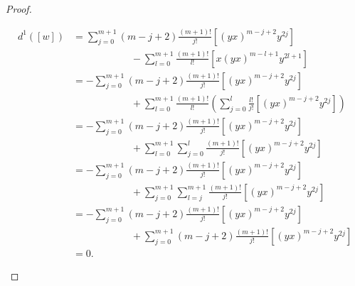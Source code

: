 \documentclass[a4paper,oneside,fleqn,11pt]{article}
\numberwithin{prop}{subsection}
\begin{document}
\begin{proof}
\begin{itemize}
			\begin{align*}
				d^1(\left[w\right]) &=
					\sum_{j = 0}^{m + 1}(m - j + 2)\frac{(m + 1)!}{j!}\left[(yx)^{m -j + 2}y^{2j}\right]\\
				& \hspace{70pt}-\sum_{l = 0}^{m + 1}\frac{(m + 1)!}{l!}\left[x(yx)^{m - l + 1}y^{2l + 1}\right] \\
				&=-\sum_{j = 0}^{m + 1}(m - j + 2)\frac{(m + 1)!}{j!}\left[(yx)^{m -j + 2}y^{2j}\right]\\
				& \hspace{70pt} + \sum_{l = 0}^{m + 1}\frac{(m + 1)!}{l!}
					\left(\sum_{j = 0}^l\frac{l!}{j!}\left[(yx)^{m - j + 2}y^{2j}\right]\right) \\
				&= -	\sum_{j = 0}^{m + 1}(m - j + 2)\frac{(m + 1)!}{j!}\left[(yx)^{m -j + 2}y^{2j}\right]\\
				& \hspace{70pt} + \sum_{l = 0}^{m + 1}\sum_{j = 0}^{l}\frac{(m + 1)!}{j!}
					\left[(yx)^{m - j + 2}y^{2j}\right]\\
				&= -	\sum_{j = 0}^{m + 1}(m - j + 2)\frac{(m + 1)!}{j!}\left[(yx)^{m -j + 2}y^{2j}\right]\\
				& \hspace{70pt} + \sum_{j = 0}^{m + 1}\sum_{l = j}^{m + 1}\frac{(m + 1)!}{j!}
					\left[(yx)^{m - j + 2}y^{2j}\right]\\
				&= -	\sum_{j = 0}^{m + 1}(m - j + 2)\frac{(m + 1)!}{j!}\left[(yx)^{m -j + 2}y^{2j}\right]\\
				& \hspace{70pt} + \sum_{j = 0}^{m + 1}(m - j + 2)\frac{(m + 1)!}{j!}
					\left[(yx)^{m - j + 2}y^{2j}\right]\\
				&= 0.
			\end{align*}	 
	\end{itemize}
\end{proof}
\end{document}

